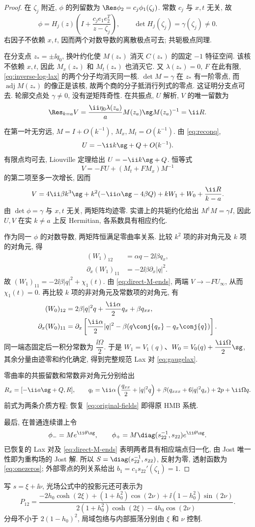 \begin{proof}
在 $\zeta_j$ 附近, $\phi$ 的列留数为 $\Res\phi_2=c_j\phi_1(\zeta_j)$. 常数 $c_j$ 与 $x,t$ 无关, 故
\[
\phi=H_j(z)\left(I+\dfrac{c_je_1e_2^T}{z-\zeta_j}\right),\qquad
\det H_j(\zeta_j)=\gamma(\zeta_j)\ne0.
\]
右因子不依赖 $x,t$, 因而两个对数导数的离散极点可去; 共轭极点同理.

在分支点 $z_*=\pm\ii q_0$, 换叶约化使 $M(z_*)$ 消灭 $C(z_*)$ 的固定 $-1$ 特征空间. 该核不依赖 $x,t$, 因此 $M_x(z_*)$ 和 $M_t(z_*)$ 也消灭它. 又 $\lambda(z_*)=0$, $F$ 在此有限, \eqref{eq:inverse-log-lax} 的两个分子均消灭同一核. $\det M=\gamma$ 在 $z_*$ 有一阶零点, 而 $\operatorname{adj}M(z_*)$ 的像正是该核, 故两个商的分子抵消行列式的零点. 这证明分支点可去. 轮廓交点处 $\gamma\ne0$, 没有逆矩阵奇性. 在共振点, $U$ 解析, $V$ 的唯一留数为
\[
\Res_{k=a}V=\dfrac{\ii\eta_0\lambda(z_a)}{a}M(z_a)\sg M(z_a)^{-1}=\ii R.
\]

在第一叶无穷远, $M=I+O(k^{-1})$, $M_x,M_t=O(k^{-1})$. 由 \eqref{eq:reconq},
\[
U=-\ii k\sg+Q+O(k^{-1}).
\]
有限点均可去, Liouville 定理给出 $U=-\ii k\sg+Q$. 恒等式
\[
V=-FU+(M_t+FM_x)M^{-1}
\]
的第二项至多一次增长, 因而
\begin{equation}\label{eq:inverse-V-form}
V=4\ii\beta k^3\sg+k^2(-\ii\alpha\sg-4\beta Q)
+kW_1+W_0+\dfrac{\ii R}{k-a}.
\end{equation}
由 $\det\phi=\gamma$ 与 $x,t$ 无关, 两矩阵均迹零. 实谱上的共轭约化给出 $M^\dagger M=\gamma I$, 因此 $U,V$ 在实 $k\ne a$ 上反 Hermitian, 各系数具有相应约化.

作为同一 $\phi$ 的对数导数, 两矩阵恒满足零曲率关系. 比较 $k^2$ 项的非对角元及 $k$ 项的对角元, 得
\[
\begin{aligned}
(W_1)_{12}&=\alpha q-2\ii\beta q_x,\\
\partial_x(W_1)_{11}&=-2\ii\beta\partial_x|q|^2.
\end{aligned}
\]
故 $(W_1)_{11}=-2\ii\beta|q|^2+\chi_1(t)$. 由 \eqref{eq:direct-M-ends}, 两端 $V\to-FU_\infty$, 从而 $\chi_1(t)=0$. 再比较 $k$ 项的非对角元及常数项的对角元, 有
\[
\begin{aligned}
(W_0)_{12}&=2\beta|q|^2q+\dfrac{\ii\alpha}{2}q_x+\beta q_{xx},\\
\partial_x(W_0)_{11}&=\partial_x\left[\dfrac{\ii\alpha}{2}|q|^2-\beta(q\conj{q_x}-q_x\conj{q})\right].
\end{aligned}
\]
同一端态固定后一积分常数为 $\dfrac{\ii\Omega}{2}$. 于是 $W_1=V_1(q)$、$W_0=V_0(q)+\dfrac{\ii\Omega}{2}\sg$, 其余分量由迹零和约化确定, 得到完整规范 Lax 对 \eqref{eq:gaugelax}.

零曲率的共振留数和常数非对角元分别给出
\[
R_x=[-\ii a\sg+Q,R],\qquad
q_t=\ii\alpha\left(\dfrac{q_{xx}}{2}+|q|^2q\right)
+\beta(q_{xxx}+6|q|^2q_x)+2p+\ii\Omega q.
\]
前式为两条介质方程; 恢复 \eqref{eq:original-fields} 即得原 HMB 系统.

最后, 在普通连续谱上令
\[
\phi_-=Me^{\ii\theta\sg},\qquad
\phi_+=M\diag(s_{22}^{-1},s_{22})e^{\ii\theta\sg}.
\]
已恢复的 Lax 对及 \eqref{eq:direct-M-ends} 表明两者具有相应端点归一化, 由 Jost 唯一性即为重构场的 Jost 解. 所以 $S=\diag(s_{22}^{-1},s_{22})$, 反射为零, 透射函数为 \eqref{eq:onezeros}; 外部零点的列关系给出 $b_1=c_1s_{22}'(\zeta_1)=1$.
\end{proof}

写 $s=\xi+\ii\nu$, 光场公式中的投影元还可表示为
\begin{equation}\label{eq:hyperbolic-projector}
P_{12}=\dfrac{-2h_0\cosh(2\xi)+(1+h_0^2)\cos(2\nu)+\ii(1-h_0^2)\sin(2\nu)}
{2(1+h_0^2)\cosh(2\xi)-4h_0\cos(2\nu)}.
\end{equation}
分母不小于 $2(1-h_0)^2$, 局域包络与内部振荡分别由 $\xi$ 和 $\nu$ 控制.
